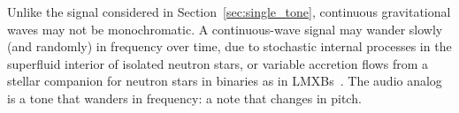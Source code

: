 \documentclass[paper-main.tex]{subfiles}
\begin{document}

Unlike the signal considered in Section~\ref{sec:single_tone}, continuous gravitational waves may not be monochromatic.
A continuous-wave signal may wander slowly (and randomly) in frequency over time, due to stochastic internal processes in the superfluid interior of isolated neutron stars\cite{MelatosDouglassSimula:2015,Jones:2010}, or variable accretion flows from a stellar companion for neutron stars in binaries as in LMXBs~\cite{BildstenTB:1998}. 
The audio analog is a tone that wanders in frequency: a note that changes in pitch. 
\end{document}
